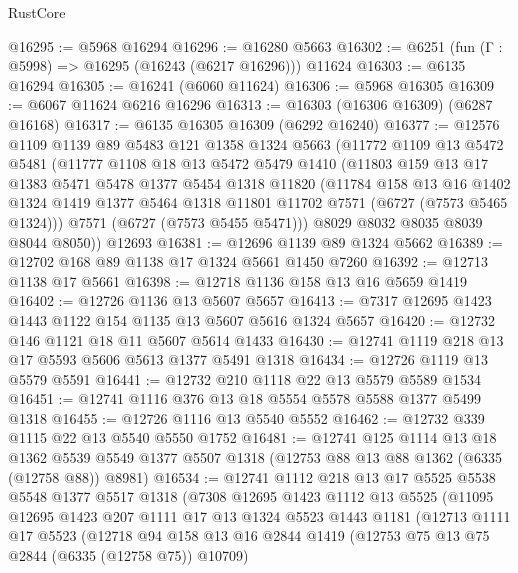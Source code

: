 \begin{lexlean}{RustCore}
\begin{coremodule}
@16295 := @5968 @16294
@16296 := @16280 @5663
@16302 := @6251 (fun (Γ : @5998) => @16295 (@16243 (@6217 @16296))) @11624
@16303 := @6135 @16294
@16305 := @16241 (@6060 @11624)
@16306 := @5968 @16305
@16309 := @6067 @11624 @6216 @16296
@16313 := @16303 (@16306 @16309) (@6287 @16168)
@16317 := @6135 @16305 @16309 (@6292 @16240)
@16377 := @12576
    @1109
    @1139
    @89
    @5483
    @121
    @1358
    @1324
    @5663
    (@11772
      @1109
      @13
      @5472
      @5481
      (@11777
        @1108
        @18
        @13
        @5472
        @5479
        @1410
        (@11803
          @159
          @13
          @17
          @1383
          @5471
          @5478
          @1377
          @5454
          @1318
          @11820
          (@11784
            @158
            @13
            @16
            @1402
            @1324
            @1419
            @1377
            @5464
            @1318
            @11801
            @11702
            @7571
            (@6727 (@7573 @5465 @1324)))
          @7571
          (@6727 (@7573 @5455 @5471)))
        @8029
        @8032
        @8035
        @8039
        @8044
        @8050))
    @12693
@16381 := @12696 @1139 @89 @1324 @5662
@16389 := @12702 @168 @89 @1138 @17 @1324 @5661 @1450 @7260
@16392 := @12713 @1138 @17 @5661
@16398 := @12718 @1136 @158 @13 @16 @5659 @1419
@16402 := @12726 @1136 @13 @5607 @5657
@16413 := @7317 @12695 @1423 @1443 @1122 @154 @1135 @13 @5607 @5616 @1324 @5657
@16420 := @12732 @146 @1121 @18 @11 @5607 @5614 @1433
@16430 := @12741 @1119 @218 @13 @17 @5593 @5606 @5613 @1377 @5491 @1318
@16434 := @12726 @1119 @13 @5579 @5591
@16441 := @12732 @210 @1118 @22 @13 @5579 @5589 @1534
@16451 := @12741 @1116 @376 @13 @18 @5554 @5578 @5588 @1377 @5499 @1318
@16455 := @12726 @1116 @13 @5540 @5552
@16462 := @12732 @339 @1115 @22 @13 @5540 @5550 @1752
@16481 := @12741
    @125
    @1114
    @13
    @18
    @1362
    @5539
    @5549
    @1377
    @5507
    @1318
    (@12753 @88 @13 @88 @1362 (@6335 (@12758 @88)) @8981)
@16534 := @12741
    @1112
    @218
    @13
    @17
    @5525
    @5538
    @5548
    @1377
    @5517
    @1318
    (@7308
      @12695
      @1423
      @1112
      @13
      @5525
      (@11095
        @12695
        @1423
        @207
        @1111
        @17
        @13
        @1324
        @5523
        @1443
        @1181
        (@12713
          @1111
          @17
          @5523
          (@12718
            @94
            @158
            @13
            @16
            @2844
            @1419
            (@12753 @75 @13 @75 @2844 (@6335 (@12758 @75)) @10709)

\end{coremodule}
\end{lexlean}
